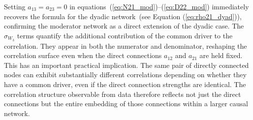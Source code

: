 \documentclass[12pt]{article}
\begin{document}
Setting $a_{13}=a_{23}=0$ in
equations~(\ref{eq:N21_mod})--(\ref{eq:D22_mod}) immediately
recovers the formula for the dyadic network~(see Equation (\ref{eq:rho21_dyad})),
confirming the moderator network as a direct extension of
the dyadic case.
The $\sigma_{W_3}$ terms quantify the additional contribution
of the common driver to the correlation. They appear in both
the numerator and denominator, reshaping the correlation
surface even when the direct connections $a_{12}$ and $a_{21}$
are held fixed.
This has an important practical implication. The same pair of
directly connected nodes can exhibit substantially different
correlations depending on whether they have a common driver,
even if the direct connection strengths are identical.
The correlation structure observable from data therefore
reflects not just the direct connections but the entire
embedding of those connections within a larger causal network.
\end{document}
